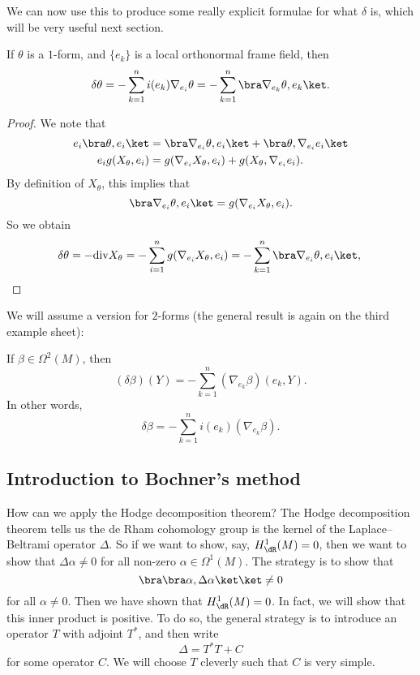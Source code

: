\documentclass[a4paper]{article}
\renewcommand\div{\mathrm{div}}
\begin{document}
We can now use this to produce some really explicit formulae for what $\delta$ is, which will be very useful next section.
\begin{cor}
  If $\theta$ is a $1$-form, and $\{e_k\}$ is a local orthonormal frame field, then
  \[
    \delta \theta = - \sum_{k = 1}^n i(e_k) \nabla_{e_i} \theta = - \sum_{k = 1}^n \bra \nabla_{e_k} \theta, e_k\ket.
  \]
\end{cor}

\begin{proof}
  We note that
  \begin{align*}
    e_i \bra \theta, e_i\ket &= \bra \nabla_{e_i} \theta, e_i\ket + \bra \theta, \nabla_{e_i}e_i\ket\\
    e_i g(X_\theta, e_i) &= g(\nabla_{e_i} X_\theta, e_i) + g(X_\theta, \nabla_{e_i}e_i).
  \end{align*}
  By definition of $X_\theta$, this implies that
  \[
    \bra \nabla_{e_i} \theta, e_i\ket = g(\nabla_{e_i} X_\theta, e_i).
  \]
  So we obtain
  \[
    \delta \theta = - \div X_\theta = -\sum_{i = 1}^n g(\nabla_{e_i} X_\theta, e_i) = - \sum_{k = 1}^n \bra \nabla_{e_i} \theta, e_i\ket,\qedhere
  \]
\end{proof}

We will assume a version for $2$-forms (the general result is again on the third example sheet):
\begin{prop}
  If $\beta \in \Omega^2(M)$, then
  \[
    (\delta \beta)(Y) = - \sum_{k = 1}^n (\nabla_{e_k} \beta)(e_k, Y).
  \]
  In other words,
  \[
    \delta \beta = - \sum_{k = 1}^n i(e_k) (\nabla_{e_k}\beta).
  \]
\end{prop}

\subsection{Introduction to Bochner's method}
How can we apply the Hodge decomposition theorem? The Hodge decomposition theorem tells us the de Rham cohomology group is the kernel of the Laplace--Beltrami operator $\Delta$. So if we want to show, say, $H^1_{\dR}(M) = 0$, then we want to show that $\Delta \alpha \not= 0$ for all non-zero $\alpha \in \Omega^1(M)$. The strategy is to show that
\[
  \bra \bra \alpha, \Delta \alpha\ket\ket \not= 0
\]
for all $\alpha \not= 0$. Then we have shown that $H^1_{\dR}(M) = 0$. In fact, we will show that this inner product is positive. To do so, the general strategy is to introduce an operator $T$ with adjoint $T^*$, and then write
\[
  \Delta = T^* T + C
\]
for some operator $C$. We will choose $T$ cleverly such that $C$ is very simple.
\end{document}
